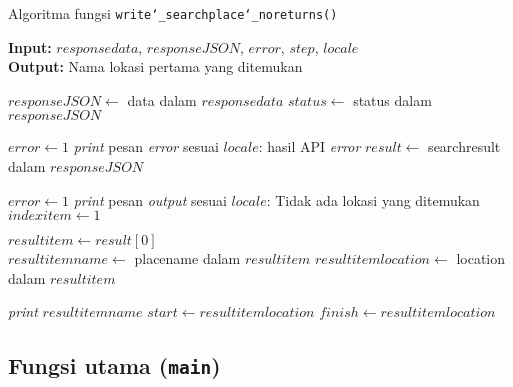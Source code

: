 \begin{algorithm}[h]
	\caption{\textendash\xspace Algoritma fungsi \texttt{write\char`_searchplace\char`_noreturns()}}
	\label{alg:design-write-searchplacenoreturns}
	\vspace{-0.6\baselineskip}
	\begin{flushleft}
		\textbf{Input:} $responsedata$, $responseJSON$, $error$, $step$, $locale$ \\
		\textbf{Output:} Nama lokasi pertama yang ditemukan \\
	\end{flushleft}
	\vspace{-1.05\baselineskip}
	\begin{algorithmic}
		\State $responseJSON \gets$ data dalam $responsedata$
		\State $status \gets$ \textquotesingle\textquotesingle status\textquotesingle\textquotesingle\xspace dalam $responseJSON$
		
			\State $error \gets 1$
			\State \textit{print} pesan \textit{error} sesuai $locale$: hasil API \textit{error}
		\Else
			\State $result \gets$ \textquotesingle\textquotesingle searchresult\textquotesingle\textquotesingle\xspace dalam $responseJSON$
			
				\State $error \gets 1$
				\State \textit{print} pesan \textit{output} sesuai $locale$: Tidak ada lokasi yang ditemukan
			\Else
				\State $indexitem \gets 1$
				
				\State $resultitem \gets result[0]$ \\
				\State $resultitemname \gets$ \textquotesingle\textquotesingle placename\textquotesingle\textquotesingle\xspace dalam $resultitem$
				\State $resultitemlocation \gets$ \textquotesingle\textquotesingle location\textquotesingle\textquotesingle\xspace dalam $resultitem$
				
				\State \textit{print} $resultitemname$
					\State $start \gets resultitemlocation$
					\State $finish \gets resultitemlocation$
				\EndIf
			\EndIf
		\EndIf
	\end{algorithmic}
\end{algorithm}

\subsection{Fungsi utama (\texttt{main})}
\label{sec:design-code-main}

